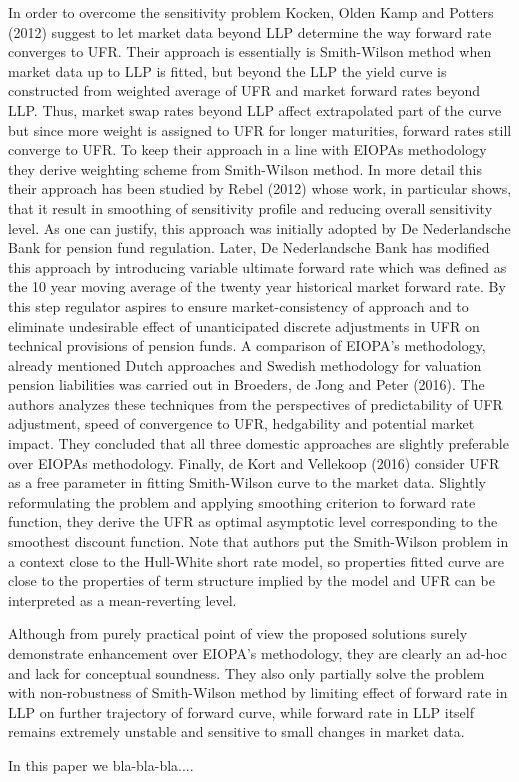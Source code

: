 	In order to overcome the sensitivity problem Kocken, Olden Kamp and  Potters (2012) suggest to let market data beyond LLP determine the way forward rate converges to UFR.
	Their approach is essentially is Smith-Wilson method when market data up to LLP is  fitted, but beyond the LLP the yield curve is constructed from weighted average of UFR and market forward rates beyond LLP.
	Thus, market swap rates beyond LLP affect extrapolated part of the curve but since more weight is assigned to UFR for longer maturities, forward rates still converge to UFR. 
	To keep their approach in a line with EIOPAs methodology they derive weighting scheme from Smith-Wilson method.
	In more detail this their approach has been studied by Rebel (2012) whose work, in particular shows, that it result in smoothing of sensitivity profile and reducing overall sensitivity level.
	As one can justify, this approach was initially adopted by De Nederlandsche Bank for pension fund regulation.
	Later, De Nederlandsche Bank has modified this approach by introducing variable ultimate forward rate which was defined as the 10 year moving average of the twenty year historical market forward rate.
	By this step regulator aspires to ensure market-consistency of approach and to eliminate undesirable effect of unanticipated discrete adjustments in UFR on technical provisions of pension funds.
	A comparison of EIOPA's methodology, already mentioned Dutch approaches and Swedish methodology for valuation pension liabilities was carried out in Broeders, de Jong and Peter (2016).
	The authors analyzes these techniques from the perspectives of predictability of UFR adjustment, speed of convergence to UFR, hedgability and potential market impact. 
	They concluded that all three domestic approaches are slightly preferable over EIOPAs methodology. 
	Finally, de Kort and Vellekoop (2016) consider UFR as a free parameter in fitting Smith-Wilson curve to the market data. Slightly reformulating the problem and applying smoothing criterion to forward rate function, they derive the UFR as optimal asymptotic level corresponding to the smoothest discount function. Note that authors put the Smith-Wilson problem in a context close to the Hull-White short rate model, so properties fitted curve are close to the properties of term structure implied by the model and UFR can be interpreted as a mean-reverting level.
	
	Although from purely practical point of view the proposed solutions surely demonstrate enhancement over EIOPA's methodology, they are clearly an ad-hoc and lack for conceptual soundness. 
	They also only partially solve the problem with non-robustness of Smith-Wilson method by limiting effect of forward rate in LLP on further trajectory of forward curve, while forward rate in LLP itself remains extremely unstable and sensitive to small changes in market data. 

	
	In this paper we bla-bla-bla....
	
		
	
	

